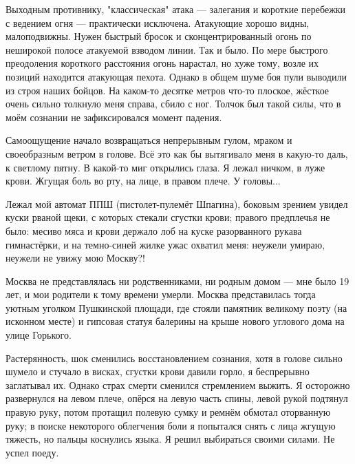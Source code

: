 \label{9-1}
Выходным противнику, "классическая" атака — залегания и короткие перебежки с ведением огня — практически исключена. Атакующие хорошо видны, малоподвижны. Нужен быстрый бросок и сконцентрированный огонь по неширокой полосе атакуемой взводом линии. Так и было. По мере быстрого преодоления короткого расстояния огонь нарастал, но хуже тому, возле их позиций находится атакующая пехота. Однако в общем шуме боя пули выводили из строя наших бойцов. На каком-то десятке метров что-то плоское, жёсткое очень сильно толкнуло меня справа, сбило с ног. Толчок был такой силы, что в моём сознании не зафиксировался момент падения.

\label{9-2}
Самоощущение начало возвращаться непрерывным гулом, мраком и своеобразным ветром в голове. Всё это как бы вытягивало меня в какую-то даль, к светлому пятну. В какой-то миг открылись глаза. Я лежал ничком, в луже крови. Жгущая боль во рту, на лице, в правом плече. У головы...

\label{10-1}
Лежал мой автомат ППШ (пистолет-пулемёт Шпагина), боковым зрением увидел куски рваной щеки, с которых стекали сгустки крови; правого предплечья не было: месиво мяса и крови держало лоб на куске разорванного рукава гимнастёрки, и на темно-синей жилке ужас охватил меня: неужели умираю, неужели не увижу мою Москву?!

\label{10-2}
Москва не представлялась ни родственниками, ни родным домом — мне было 19 лет, и мои родители к тому времени умерли. Москва представилась тогда уютным уголком Пушкинской площади, где стояли памятник великому поэту (на исконном месте) и гипсовая статуя балерины на крыше нового углового дома на улице Горького.

\label{10-3}
Растерянность, шок сменились восстановлением сознания, хотя в голове сильно шумело и стучало в висках, сгустки крови давили горло, я беспрерывно заглатывал их. Однако страх смерти сменился стремлением выжить. Я осторожно развернулся на левом плече, опёрся на левую часть спины, левой рукой подтянул правую руку, потом протащил полевую сумку и ремнём обмотал оторванную руку; в поиске некоторого облегчения боли я попытался снять с лица жгущую тяжесть, но пальцы коснулись языка. Я решил выбираться своими силами. Не успел поеду.

